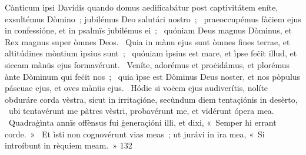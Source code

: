 { Cànticum ìpsi Davídis quando domus aedificabátur post captivitátem}
{%
eníte, exsultémus Dòmino~; jubilémus Deo salutári nostro~; 
~praeoccupémus fàċiem ejus in confessióne, et in psalmïs jubilémus ei~; 
~quóniam Deus magnus Dòminus, et Rex magnus super òmnes Deos. 
~Quia in mànu ejus sunt òmnes fines terrae, et altitúdines mòntium ìpsius sunt~; 
~quóniam ìpsius est mare, et ìpse feċit illud, et siccam mànüs ejus formavérunt. 
~Veníte, adorémus et proċidámus, et plorémus ànte Dòminum qui feċit nos~; 
~quia ìpse est Dòminus Deus noster, et nos pòpulus páscuae ejus, et oves mànüs ejus. 
~Hódie si voċem ejus audiverítis, nolíte obduráre corda vèstra, sicut in irritaçióne, secùndum diem tentaçiónis in desèrto, 
~ubi tentavérunt me pàtres vèstri, probavérunt me, et vïdérunt ópera mea. 
~Quadraġìnta annïs offènsus fui ġeneraçióni illi, et dixi, «~Semper hi errant corde.~»
~Et ìsti non cognovérunt vias meas~; ut jurávi in ira mea, «~Si introíbunt in rèquiem meam.~»
}
{13}{2}
